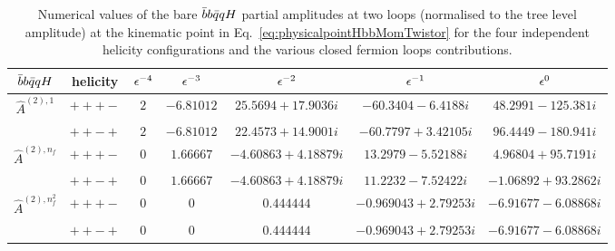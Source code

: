 \documentclass[main.tex]{subfiles}
\begin{document}
\begin{table}[t!]
\centering
\begin{tabularx}{1.0\textwidth}{|C{0.7}|C{0.8}|C{0.6}|C{1.2}|C{1.2}|C{1.2}|C{1.3}|}
\hline
 $\bar{b}b\bar{q}qH$     & helicity & $\epsilon^{-4}$ & $\epsilon^{-3}$ & $\epsilon^{-2}$ & $\epsilon^{-1}$ & $\epsilon^{0}$ \\
\hline
$\hat A^{(2),1}$ & $+++-$ & $ 2 $ & $ -6.81012$ & $ 25.5694 + 17.9036 i$ & $ -60.3404 - 6.4188 i$ & $ 48.2991 - 125.381 i $ \\
                 & $++-+$ & $ 2 $ & $ -6.81012$ & $ 22.4573 + 14.9001 i$ & $ -60.7797 + 3.42105 i$ & $ 96.4449 - 180.941 i $ \\
\hline
$\hat A^{(2),n_f}$ & $+++-$ & $ 0$ & $ 1.66667$ & $ -4.60863 + 4.18879 i$ & $ 13.2979 - 5.52188 i$ & $ 4.96804 + 95.7191 i $ \\
                   & $++-+$ & $ 0$ & $ 1.66667$ & $ -4.60863 + 4.18879 i$ & $ 11.2232 - 7.52422 i$ & $ -1.06892 + 93.2862 i $ \\
\hline
$\hat A^{(2),n_f^2}$ & $+++-$ & $ 0$ & $ 0$ & $ 0.444444$ & $ -0.969043 + 2.79253 i$ & $ -6.91677 - 6.08868 i $ \\
                     & $++-+$ & $ 0$ & $ 0$ & $ 0.444444$ & $ -0.969043 + 2.79253 i$ & $ -6.91677 - 6.08868 i $ \\
\hline
\end{tabularx}
\caption{\label{tab:benchmark2q2bHbare} Numerical values of the bare $\bar{b}b\bar{q}qH$ partial amplitudes at two loops (normalised to the tree level amplitude) at the kinematic point in Eq.~\eqref{eq:physicalpointHbbMomTwistor} for the four independent helicity configurations and the various closed fermion loops contributions. }
\end{table}
\end{document}
